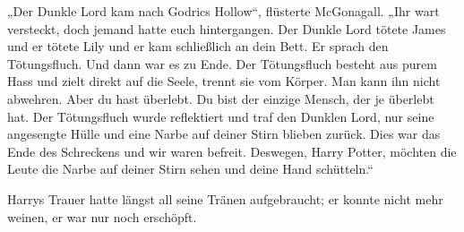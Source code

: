 „Der Dunkle Lord kam nach Godrics Hollow“, flüsterte McGonagall.
„Ihr wart versteckt, doch jemand hatte euch hintergangen. Der Dunkle Lord tötete James und er tötete Lily und er kam schließlich an dein Bett. Er sprach den Tötungsfluch. Und dann war es zu Ende. Der Tötungsfluch besteht aus purem Hass und zielt direkt auf die Seele, trennt sie vom Körper. Man kann ihn nicht abwehren. Aber du hast überlebt. Du bist der einzige Mensch, der je überlebt hat. Der Tötungsfluch wurde reflektiert und traf den Dunklen Lord, nur seine angesengte Hülle und eine Narbe auf deiner Stirn blieben zurück. Dies war das Ende des Schreckens und wir waren befreit. Deswegen, Harry Potter, möchten die Leute die Narbe auf deiner Stirn sehen und deine Hand schütteln.“

Harrys Trauer hatte längst all seine Tränen aufgebraucht; er konnte nicht mehr weinen, er war nur noch erschöpft.

